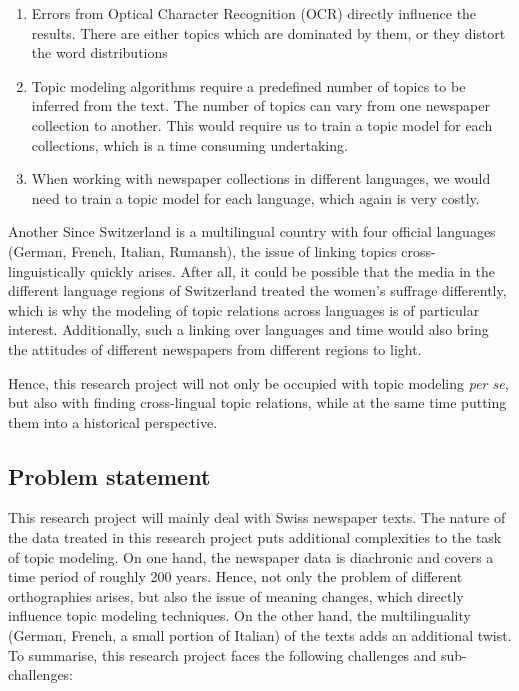 \begin{enumerate}
    \item Errors from Optical Character Recognition (OCR) directly influence the results. There are either topics which are dominated by them, or they distort the word distributions
    \item Topic modeling algorithms require a predefined number of topics to be inferred from the text. The number of topics can vary from one newspaper collection to another. This would require us to train a topic model for each collections, which is a time consuming undertaking.
    \item When working with newspaper collections in different languages, we would need to train a topic model for each language, which again is very costly.
\end{enumerate}

Another
Since Switzerland is a multilingual country with four official languages (German, French, Italian, Rumansh), the issue of linking topics cross-linguistically quickly arises. After all, it could be possible that the media in the different language regions of Switzerland treated the women's suffrage differently, which is why the modeling of topic relations across languages is of particular interest. Additionally, such a linking over languages and time would also bring the attitudes of different newspapers from different regions to light.

Hence, this research project will not only be occupied with topic modeling \textit{per se}, but also with finding cross-lingual topic relations, while at the same time putting them into a historical perspective.

\subsection{Problem statement}
This research project will mainly deal with Swiss newspaper texts. The nature of the data treated in this research project puts additional complexities to the task of topic modeling. On one hand, the newspaper data is diachronic and covers a time period of roughly 200 years. Hence, not only the problem of different orthographies arises, but also the issue of meaning changes, which directly influence topic modeling techniques. On the other hand, the multilinguality (German, French, a small portion of Italian) of the texts adds an additional twist. To summarise, this research project faces the following challenges and sub-challenges:

